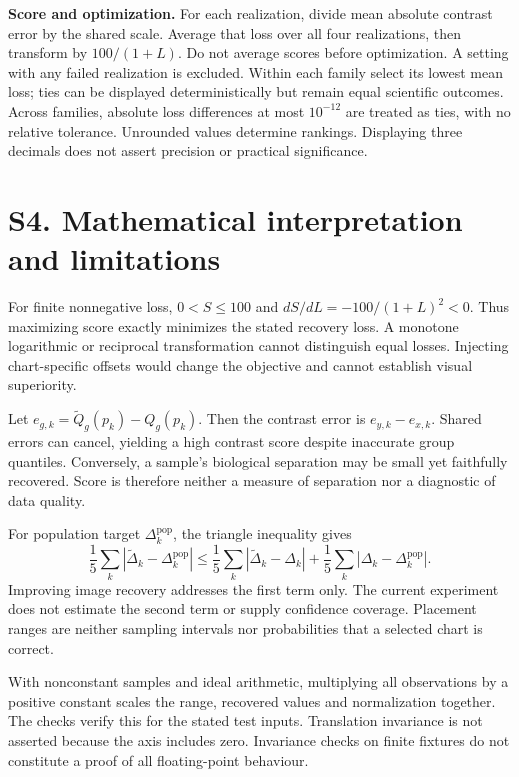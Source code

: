 \documentclass[10pt]{article}
\begin{document}
\textbf{Score and optimization.} For each realization, divide mean absolute contrast error by the shared scale. Average that loss over all four realizations, then transform by $100/(1+L)$. Do not average scores before optimization. A setting with any failed realization is excluded. Within each family select its lowest mean loss; ties can be displayed deterministically but remain equal scientific outcomes. Across families, absolute loss differences at most $10^{-12}$ are treated as ties, with no relative tolerance. Unrounded values determine rankings. Displaying three decimals does not assert precision or practical significance.

\section*{S4. Mathematical interpretation and limitations}
For finite nonnegative loss, $0<S\leq100$ and $dS/dL=-100/(1+L)^2<0$. Thus maximizing score exactly minimizes the stated recovery loss. A monotone logarithmic or reciprocal transformation cannot distinguish equal losses. Injecting chart-specific offsets would change the objective and cannot establish visual superiority.

Let $e_{g,k}=\widetilde Q_g(p_k)-Q_g(p_k)$. Then the contrast error is $e_{y,k}-e_{x,k}$. Shared errors can cancel, yielding a high contrast score despite inaccurate group quantiles. Conversely, a sample's biological separation may be small yet faithfully recovered. Score is therefore neither a measure of separation nor a diagnostic of data quality.

For population target $\Delta_k^{\mathrm{pop}}$, the triangle inequality gives
\[
\frac15\sum_k|\widetilde\Delta_k-\Delta_k^{\mathrm{pop}}|
\leq \frac15\sum_k|\widetilde\Delta_k-\Delta_k|
+\frac15\sum_k|\Delta_k-\Delta_k^{\mathrm{pop}}|.
\]
Improving image recovery addresses the first term only. The current experiment does not estimate the second term or supply confidence coverage. Placement ranges are neither sampling intervals nor probabilities that a selected chart is correct.

With nonconstant samples and ideal arithmetic, multiplying all observations by a positive constant scales the range, recovered values and normalization together. The checks verify this for the stated test inputs. Translation invariance is not asserted because the axis includes zero. Invariance checks on finite fixtures do not constitute a proof of all floating-point behaviour.
\end{document}
